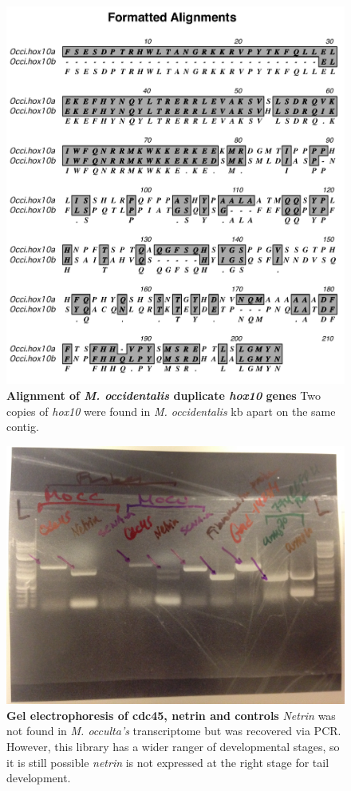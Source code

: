 \begin{figure}[tbp]
\centering
\includegraphics[scale=0.95]{figures/Occi_hox10.pdf}
\caption{\textbf{Alignment of \textit{M. occidentalis} duplicate \textit{hox10} genes} Two copies of \textit{hox10} were found in \textit{M. occidentalis}  kb apart on the same contig.}
\label{fig:occihox10}
\end{figure}

\begin{figure}[tbp]
\centering
\includegraphics[scale=0.10]{figures/gel.jpg}
\caption{\textbf{Gel electrophoresis of cdc45, netrin and controls} \textit{Netrin} was not found in \textit{M. occulta's} transcriptome but was recovered via PCR. However, this library has a wider ranger of developmental stages, so it is still possible \textit{netrin} is not expressed at the right stage for tail development.}
\label{fig:gel}
\end{figure}

